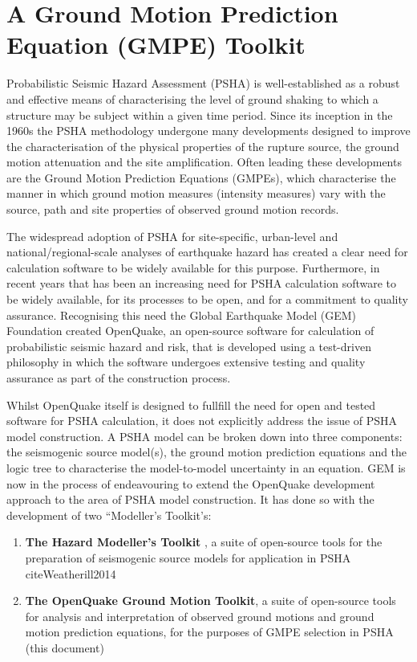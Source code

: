 \section{A Ground Motion Prediction Equation (GMPE) Toolkit}
\label{sec:gmpe_toolkit}

Probabilistic Seismic Hazard Assessment (PSHA) is well-established as a robust and effective means of characterising the level of ground shaking to which a structure may be subject within a given time period. Since its inception in the 1960s the PSHA methodology undergone many developments designed to improve the characterisation of the physical properties of the rupture source, the ground motion attenuation and the site amplification. Often leading these developments are the Ground Motion Prediction Equations (GMPEs), which characterise the manner in which ground motion measures (intensity measures) vary with the source, path and site properties of observed ground motion records. 

The widespread adoption of PSHA for site-specific, urban-level and national/regional-scale analyses of earthquake hazard has created a clear need for calculation software to be widely available for this purpose. Furthermore, in recent years that has been an increasing need for PSHA calculation software to be widely available, for its processes to be open, and for a commitment to quality assurance. Recognising this need the Global Earthquake Model (GEM) Foundation created OpenQuake, an open-source software for calculation of probabilistic seismic hazard and risk, that is developed using a test-driven philosophy in which the software undergoes extensive testing and quality assurance as part of the construction process. 

Whilst OpenQuake itself is designed to fullfill the need for open and tested software for PSHA calculation, it does not explicitly address the issue of PSHA model construction. A PSHA model can be broken down into three components: the seismogenic source model(s), the ground motion prediction equations and the logic tree to characterise the model-to-model uncertainty in an equation. GEM is now in the process of endeavouring to extend the OpenQuake development approach to the area of PSHA model construction. It has done so with the development of two ``Modeller's Toolkit's: 

\begin{enumerate}
\item \textbf{The Hazard Modeller's Toolkit} , a suite of open-source tools for the preparation of seismogenic source models for application in PSHA citeWeatherill2014
\item \textbf{The OpenQuake Ground Motion Toolkit}, a suite of open-source tools for analysis and interpretation of observed ground motions and ground motion prediction equations, for the purposes of GMPE selection in PSHA (this document)
\end{enumerate}

